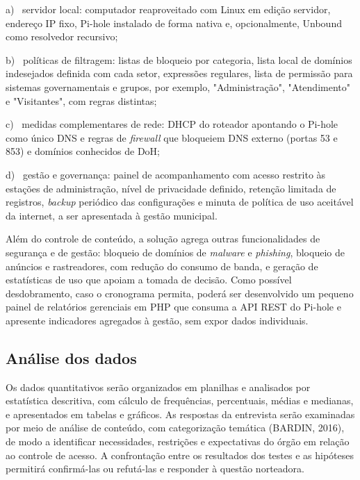 \documentclass[12pt,a4paper]{article}
\begin{document}
{\leftskip=1.25cm\noindent\hangindent=0.6cm a)~ servidor local: computador reaproveitado com Linux em edição servidor, endereço IP fixo, Pi-hole instalado de forma nativa e, opcionalmente, Unbound como resolvedor recursivo;\par}
{\leftskip=1.25cm\noindent\hangindent=0.6cm b)~ políticas de filtragem: listas de bloqueio por categoria, lista local de domínios indesejados definida com cada setor, expressões regulares, lista de permissão para sistemas governamentais e grupos, por exemplo, "Administração", "Atendimento" e "Visitantes", com regras distintas;\par}
{\leftskip=1.25cm\noindent\hangindent=0.6cm c)~ medidas complementares de rede: DHCP do roteador apontando o Pi-hole como único DNS e regras de \textit{firewall} que bloqueiem DNS externo (portas 53 e 853) e domínios conhecidos de DoH;\par}
{\leftskip=1.25cm\noindent\hangindent=0.6cm d)~ gestão e governança: painel de acompanhamento com acesso restrito às estações de administração, nível de privacidade definido, retenção limitada de registros, \textit{backup} periódico das configurações e minuta de política de uso aceitável da internet, a ser apresentada à gestão municipal.\par}
Além do controle de conteúdo, a solução agrega outras funcionalidades de segurança e de gestão: bloqueio de domínios de \textit{malware} e \textit{phishing}, bloqueio de anúncios e rastreadores, com redução do consumo de banda, e geração de estatísticas de uso que apoiam a tomada de decisão. Como possível desdobramento, caso o cronograma permita, poderá ser desenvolvido um pequeno painel de relatórios gerenciais em PHP que consuma a API REST do Pi-hole e apresente indicadores agregados à gestão, sem expor dados individuais.

\subsection{Análise dos dados}
Os dados quantitativos serão organizados em planilhas e analisados por estatística descritiva, com cálculo de frequências, percentuais, médias e medianas, e apresentados em tabelas e gráficos. As respostas da entrevista serão examinadas por meio de análise de conteúdo, com categorização temática (BARDIN, 2016), de modo a identificar necessidades, restrições e expectativas do órgão em relação ao controle de acesso. A confrontação entre os resultados dos testes e as hipóteses permitirá confirmá-las ou refutá-las e responder à questão norteadora.
\end{document}
